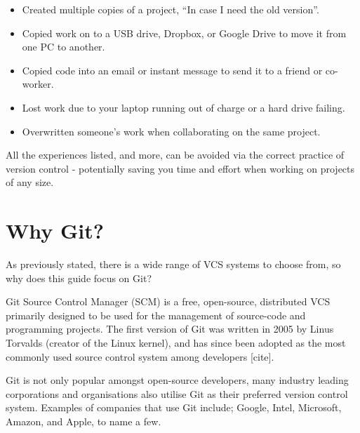 \documentclass[11pt, a4paper, titlepage]{article}
\begin{document}
\begin{itemize}
\item Created multiple copies of a project, ``In case I need the old version''.
\item Copied work on to a USB drive, Dropbox, or Google Drive to move it from
one PC to another.
\item Copied code into an email or instant message to send it to a friend or
co-worker.
\item Lost work due to your laptop running out of charge or a hard drive
failing.
\item Overwritten someone's work when collaborating on the same project.
\end{itemize}

All the experiences listed, and more, can be avoided via the correct practice
of version control - potentially saving you time and effort when working on
projects of any size.



\section{Why Git?} 
As previously stated, there is a wide range of VCS systems to choose from, so
why does this guide focus on Git?

Git Source Control Manager (SCM) is a free, open-source, distributed VCS
primarily designed to be used for the management of source-code and
programming projects.  The first version of Git was written in 2005 by Linus
Torvalds (creator of the Linux kernel), and has since been adopted as the most
commonly used source control system among developers [cite].

Git is not only popular amongst open-source developers, many industry leading
corporations and organisations also utilise Git as their preferred version
control system.  Examples of companies that use Git include; Google, Intel,
Microsoft, Amazon, and Apple, to name a few.
\end{document}
